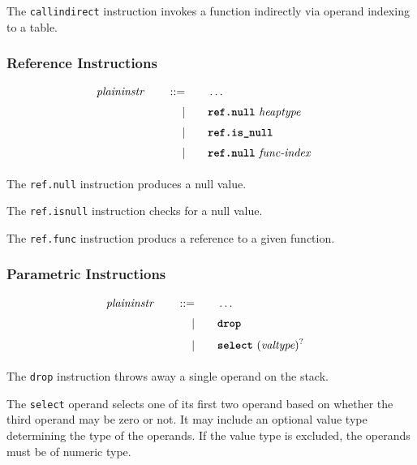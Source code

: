The \texttt{call\textunderscore indirect} instruction invokes a function indirectly via operand indexing to a table.

\subsubsection{Reference Instructions}

\begin{alignat*}{9}
    && \textit{plaininstr}\ &&\quad ::= &\quad && \dots \quad &&  \\[1mm]
    &&       &&\quad | &\quad && \textbf{\texttt{ref.null}}\ \textit{heaptype}\ \quad && \\[1mm]
    &&       &&\quad | &\quad && \textbf{\texttt{ref.is\textunderscore null}}\ \quad && \\[1mm]
    &&       &&\quad | &\quad && \textbf{\texttt{ref.null}}\ \textit{func-index}\ \quad && \\[1mm]
\end{alignat*}

The \texttt{ref.null} instruction produces a null value. \vspace {1em}

The \texttt{ref.is\textunderscore null} instruction checks for a null value. \vspace {1em}

The \texttt{ref.func} instruction producs a reference to a given function. \vspace {1em}

\subsubsection{Parametric Instructions}
\begin{alignat*}{9}
    && \textit{plaininstr}\ &&\quad ::= &\quad && \dots \quad &&  \\[1mm]
    &&       &&\quad | &\quad && \textbf{\texttt{drop}} \quad && \\[1mm]
    &&       &&\quad | &\quad && \textbf{\texttt{select}}\ (\textit{valtype})^? \quad && \\[1mm]
\end{alignat*}

The \texttt{drop} instruction throws away a single operand on the stack. \vspace{1em}

The \texttt{select} operand selects one of its first two operand based on whether the third operand may be zero or not.
It may include an optional value type determining the type of the operands. If the value type is excluded, the operands must be of numeric type. \vspace{1em}

